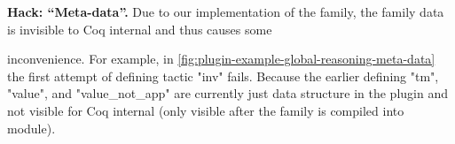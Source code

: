 

\textbf{Hack: ``Meta-data''.} Due to our implementation of the family,
the family data is invisible to Coq internal and thus causes some

inconvenience. For example, in
\cref{fig:plugin-example-global-reasoning-meta-data} the first attempt
of defining tactic "inv" fails. Because the earlier defining "tm",
"value", and "value_not_app" are currently just data structure in the
plugin and not visible for Coq internal (only visible after the family
is compiled into module). 

